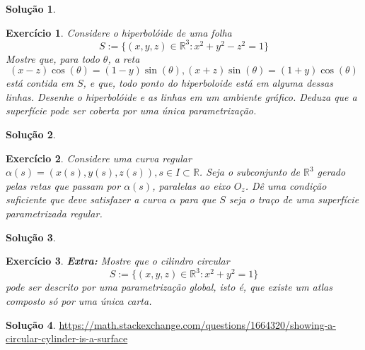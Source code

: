 \documentclass[a4paper,12pt]{article}
\newcommand{\R}{\mathbb{R}}
\theoremstyle{exer}
\newtheorem{exercise}{Exercício}
\theoremstyle{definition}
\newtheorem{solution}{Solução}
\theoremstyle{plain}
\begin{document}
\begin{solution}
    
\end{solution}

\begin{exercise}
    Considere o hiperbolóide de uma folha
    $$
    S := \{(x, y, z) \in \R^3 : x^2 + y^2 - z^2 = 1\}
    $$
    Mostre que, para todo $\theta$, a reta
    $$
    (x - z)\cos(\theta) = (1 - y)\sin(\theta), (x + z)\sin(\theta) = (1 + y)\cos(\theta)
    $$
    está contida em $S$, e que, todo ponto do hiperboloide está em alguma
    dessas linhas. Desenhe o hiperbolóide e as linhas em um ambiente gráfico.
    Deduza que a superfície pode ser coberta por uma única parametrização.
\end{exercise}

\begin{solution}
    
\end{solution}

\begin{exercise}
    Considere uma curva regular $\alpha(s) = (x(s), y(s), z(s)), s \in I
    \subset \R$. Seja o subconjunto de $\R^3$ gerado pelas retas que passam
    por $\alpha(s)$, paralelas ao eixo $O_z$. Dê uma condição suficiente que
    deve satisfazer a curva $\alpha$ para que $S$ seja o traço de uma
    superfície parametrizada regular.
\end{exercise}

\begin{solution}
    
\end{solution}

\begin{exercise}
    {\bf Extra:} Mostre que o cilindro circular
    $$
    S := \{(x, y, z) \in \R^3 : x^2 + y^2 = 1\}
    $$
    pode ser descrito por uma parametrização global, isto é, que existe um
    atlas composto só por uma única carta.
\end{exercise}

\begin{solution}
    \url{https://math.stackexchange.com/questions/1664320/showing-a-circular-cylinder-is-a-surface}
\end{solution}


\end{document}
